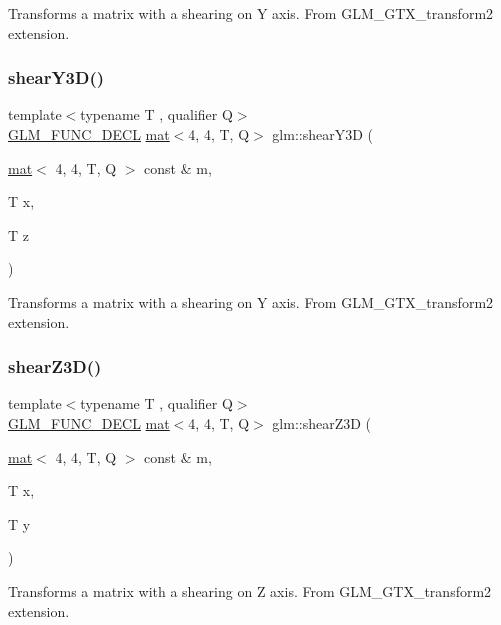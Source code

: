 Transforms a matrix with a shearing on Y axis. From G\+L\+M\+\_\+\+G\+T\+X\+\_\+transform2 extension. \mbox{\label{group__gtx__transform2_gade5bb65ffcb513973db1a1314fb5cfac}} 
\subsubsection{\texorpdfstring{shear\+Y3\+D()}{shearY3D()}}
{\footnotesize\ttfamily template$<$typename T , qualifier Q$>$ \\
\mbox{\hyperlink{setup_8hpp_ab2d052de21a70539923e9bcbf6e83a51}{G\+L\+M\+\_\+\+F\+U\+N\+C\+\_\+\+D\+E\+CL}} \mbox{\hyperlink{structglm_1_1mat}{mat}}$<$4, 4, T, Q$>$ glm\+::shear\+Y3D (\begin{DoxyParamCaption}\item[{\mbox{\hyperlink{structglm_1_1mat}{mat}}$<$ 4, 4, T, Q $>$ const \&}]{m,  }\item[{T}]{x,  }\item[{T}]{z }\end{DoxyParamCaption})}

Transforms a matrix with a shearing on Y axis. From G\+L\+M\+\_\+\+G\+T\+X\+\_\+transform2 extension. \mbox{\label{group__gtx__transform2_ga6591e0a3a9d2c9c0b6577bb4dace0255}} 
\subsubsection{\texorpdfstring{shear\+Z3\+D()}{shearZ3D()}}
{\footnotesize\ttfamily template$<$typename T , qualifier Q$>$ \\
\mbox{\hyperlink{setup_8hpp_ab2d052de21a70539923e9bcbf6e83a51}{G\+L\+M\+\_\+\+F\+U\+N\+C\+\_\+\+D\+E\+CL}} \mbox{\hyperlink{structglm_1_1mat}{mat}}$<$4, 4, T, Q$>$ glm\+::shear\+Z3D (\begin{DoxyParamCaption}\item[{\mbox{\hyperlink{structglm_1_1mat}{mat}}$<$ 4, 4, T, Q $>$ const \&}]{m,  }\item[{T}]{x,  }\item[{T}]{y }\end{DoxyParamCaption})}

Transforms a matrix with a shearing on Z axis. From G\+L\+M\+\_\+\+G\+T\+X\+\_\+transform2 extension. 